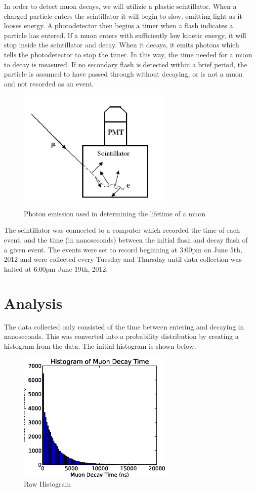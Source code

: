\documentclass[12pt,twocolumn]{article}
\begin{document}
In order to detect muon decays, we will utilizie a plastic scintillator. When a charged particle enters the scintillator
it will begin to slow, emitting light as it looses energy. A photodetector then begins a timer when a flash indicates
a particle has entered. If a muon enters with sufficiently low kinetic energy, it will stop inside the scintillator and
decay. When it decays, it emits photons which tells the photodetector to stop the timer. In this way, the time needed
for a muon to decay is measured. If no secondary flash is detected within a brief period, the particle is assumed
to have passed through without decaying, or is not a muon and not recorded as an event.

\begin{figure}[h!]
	\centering
	\label{fig:scin}
	\includegraphics[width=3in]{images/scintillatorevents}
	\caption{Photon emission used in determining the lifetime of a muon}
\end{figure}

The scintillator was connected to a computer which recorded the time of each event, and the time (in nanoseconds) between
the initial flash and decay flash of a given event. The events were set to record beginning at 3:00pm on June 5th, 2012
and were collected every Tuesday and Thursday until data collection was halted at 6:00pm June 19th, 2012.

\section{Analysis}

The data collected only consisted of the time between entering and decaying in nanoseconds. This was converted into a 
probability distribution by creating a histogram from the data. The initial histogram is shown below.

\begin{figure}[h!]
	\centering
	\includegraphics[width=3in]{images/Histogram}
	\caption{Raw Histogram}
	\label{fig:Histogram}
\end{figure}
\end{document}
